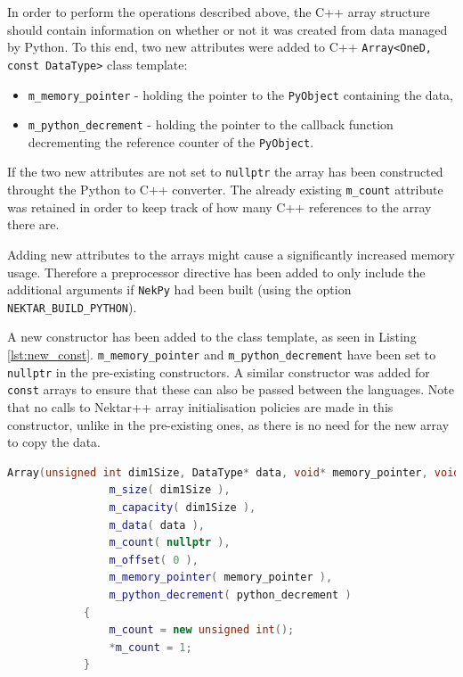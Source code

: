 In order to perform the operations described above, the C++ array structure should contain 
information on whether or not it was created from data managed by Python. To this end, 
two new attributes were added to C++ \texttt{Array<OneD, const DataType>} class template:

\begin{itemize}
    \item \texttt{m\_memory\_pointer} - holding the pointer to the 
        \texttt{PyObject} containing the data,
    \item \texttt{m\_python\_decrement} - holding the pointer to the 
        callback function decrementing the reference counter of the \texttt{PyObject}.
\end{itemize}

If the two new attributes are not set to \texttt{nullptr} the array has been constructed 
throught the Python to C++ converter. The already existing \texttt{m\_count} attribute 
was retained in order to keep track of how many C++ references to the array there are.

Adding new attributes to the arrays might cause a significantly increased memory usage. 
Therefore a preprocessor directive has been added to only include the additional arguments 
if \texttt{NekPy} had been built (using the option \texttt{NEKTAR\_BUILD\_PYTHON}).

A new constructor has been added to the class template, as seen in Listing \ref{lst:new_const}. 
\texttt{m\_memory\_pointer} and \texttt{m\_python\_decrement} have been set to 
\texttt{nullptr} in the pre-existing constructors. A similar constructor was added for 
\texttt{const} arrays to ensure that these can also be passed between the languages. Note that 
no calls to Nektar++ array initialisation policies are made in this constructor, unlike in 
the pre-existing ones, as there is no need for the new array to copy the data.

\begin{lstlisting}[caption={New constructor for initialising arrays created through the Python to C++ converter method.}, label={lst:new_const}, language=C++]
Array(unsigned int dim1Size, DataType* data, void* memory_pointer, void (*python_decrement)(void *)) :
                m_size( dim1Size ),
                m_capacity( dim1Size ),
                m_data( data ),
                m_count( nullptr ),
                m_offset( 0 ),
                m_memory_pointer( memory_pointer ),
                m_python_decrement( python_decrement )
            {
                m_count = new unsigned int(); 
                *m_count = 1;
            }
\end{lstlisting}

